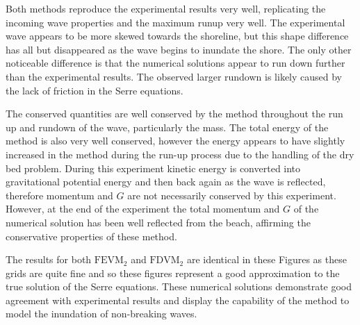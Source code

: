 Both methods reproduce the experimental results very well, replicating the incoming wave properties and the maximum runup very well. The experimental wave appears to be more skewed towards the shoreline, but this shape difference has all but disappeared as the wave begins to inundate the shore. The only other noticeable difference is that the numerical solutions appear to run down further than the experimental results. The observed larger rundown is likely caused by the lack of friction in the Serre equations.

The conserved quantities are well conserved by the method throughout the run up and rundown of the wave, particularly the mass. The total energy of the method is also very well conserved, however the energy appears to have slightly increased in the method during the run-up process due to the handling of the dry bed problem. During this experiment kinetic energy is converted into gravitational potential energy and then back again as the wave is reflected, therefore momentum and $G$ are not necessarily conserved by this experiment. However, at the end of the experiment the total momentum and $G$ of the numerical solution has been well reflected from the beach, affirming the conservative properties of these method.

The results for both $\text{FEVM}_2$ and $\text{FDVM}_2$ are identical in these Figures as these grids are quite fine and so these figures represent a good approximation to the true solution of the Serre equations. These numerical solutions demonstrate good agreement with experimental results and display the capability of the method to model the inundation of non-breaking waves.

